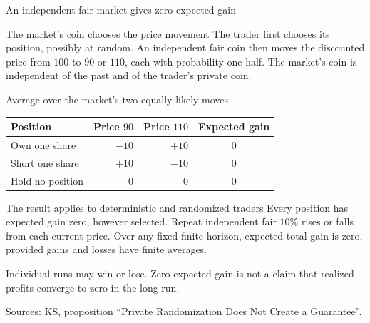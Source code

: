 \documentclass{beamer}
\newcommand{\sourcefoot}[1]{%
  \par\vfill{\fontsize{6.3}{7.5}\selectfont\color{black!65}Sources: #1\par}}
\begin{document}
\begin{frame}[shrink=8]{An independent fair market gives zero expected gain}
\small
\begin{block}{The market's coin chooses the price movement}
The trader first chooses its position, possibly at random.
An independent fair coin then moves the discounted price from $100$
to $90$ or $110$, each with probability one half.
The market's coin is independent of the past and of the trader's private coin.
\end{block}

\begin{exampleblock}{Average over the market's two equally likely moves}
\centering
\renewcommand{\arraystretch}{1.3}
\setlength{\tabcolsep}{8pt}
\begin{tabular}{@{}lrrc@{}}
Position & Price $90$ & Price $110$ & Expected gain\\\hline
\rowcolor{black!15}
Own one share & $-10$ & $+10$ & $0$\\
Short one share & $+10$ & $-10$ & $0$\\
\rowcolor{black!15}
Hold no position & $0$ & $0$ & $0$
\end{tabular}
\end{exampleblock}

\begin{alertblock}{The result applies to deterministic and randomized traders}
Every position has expected gain zero, however selected.
Repeat independent fair $10\%$ rises or falls from each current price.
Over any fixed finite horizon, expected total gain is zero,
provided gains and losses have finite averages.
\par\smallskip
Individual runs may win or lose. Zero expected gain is not a claim
that realized profits converge to zero in the long run.
\end{alertblock}
\sourcefoot{KS, proposition \enquote{Private Randomization Does Not Create a Guarantee}.}
\end{frame}
\end{document}
